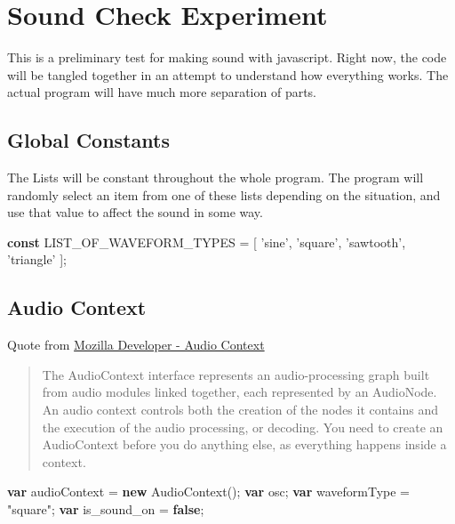 \documentclass[]{article}
\date{}
\newenvironment{Shaded}{}{}
\newcommand{\KeywordTok}[1]{\textcolor[rgb]{0.00,0.44,0.13}{\textbf{#1}}}
\newcommand{\StringTok}[1]{\textcolor[rgb]{0.25,0.44,0.63}{#1}}
\newcommand{\OperatorTok}[1]{\textcolor[rgb]{0.40,0.40,0.40}{#1}}
\newcommand{\AttributeTok}[1]{\textcolor[rgb]{0.49,0.56,0.16}{#1}}
\newcommand{\NormalTok}[1]{#1}
\begin{document}
\section{Sound Check Experiment}\label{sound-check-experiment}

This is a preliminary test for making sound with javascript. Right now,
the code will be tangled together in an attempt to understand how
everything works. The actual program will have much more separation of
parts.

\subsection{Global Constants}\label{global-constants}

The Lists will be constant throughout the whole program. The program
will randomly select an item from one of these lists depending on the
situation, and use that value to affect the sound in some way.

\begin{Shaded}
\begin{Highlighting}[]
\KeywordTok{const}\NormalTok{ LIST_OF_WAVEFORM_TYPES }\OperatorTok{=}\NormalTok{ [}
    \StringTok{'sine'}\OperatorTok{,} \StringTok{'square'}\OperatorTok{,} \StringTok{'sawtooth'}\OperatorTok{,} \StringTok{'triangle'}
\NormalTok{]}\OperatorTok{;}
\end{Highlighting}
\end{Shaded}

\subsection{Audio Context}\label{audio-context}

Quote from
\href{https://developer.mozilla.org/en-US/docs/Web/API/AudioContext}{Mozilla
Developer - Audio Context}

\begin{quote}
The AudioContext interface represents an audio-processing graph built
from audio modules linked together, each represented by an AudioNode. An
audio context controls both the creation of the nodes it contains and
the execution of the audio processing, or decoding. You need to create
an AudioContext before you do anything else, as everything happens
inside a context.
\end{quote}

\begin{Shaded}
\begin{Highlighting}[]
\KeywordTok{var}\NormalTok{ audioContext }\OperatorTok{=} \KeywordTok{new} \AttributeTok{AudioContext}\NormalTok{()}\OperatorTok{;}
\KeywordTok{var}\NormalTok{ osc}\OperatorTok{;}
\KeywordTok{var}\NormalTok{ waveformType }\OperatorTok{=} \StringTok{"square"}\OperatorTok{;}
\KeywordTok{var}\NormalTok{ is_sound_on }\OperatorTok{=} \KeywordTok{false}\OperatorTok{;}
\end{Highlighting}
\end{Shaded}
\end{document}
